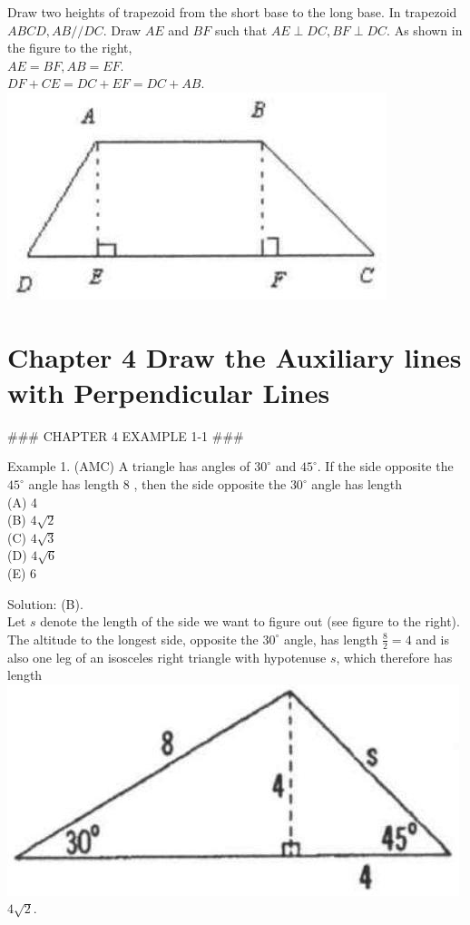 \documentclass[10pt]{article}
\begin{document}
Draw two heights of trapezoid from the short base to the long base.
In trapezoid \(A B C D, A B / / D C\). Draw \(A E\) and \(B F\) such that \(A E \perp D C, B F \perp D C\). As shown in the figure to the right,\\
\(A E=B F, A B=E F\).\\
\(D F+C E=D C+E F=D C+A B\).\\
\includegraphics[max width=\textwidth, center]{2025_04_17_97bc1f7e44d93c271a88g-074(2)}

\section*{Chapter 4 Draw the Auxiliary lines with Perpendicular Lines}

### CHAPTER 4 EXAMPLE 1-1 ###

Example 1. (AMC) A triangle has angles of \(30^{\circ}\) and \(45^{\circ}\). If the side opposite the \(45^{\circ}\) angle has length 8 , then the side opposite the \(30^{\circ}\) angle has length\\
(A) 4\\
(B) \(4 \sqrt{2}\)\\
(C) \(4 \sqrt{3}\)\\
(D) \(4 \sqrt{6}\)\\
(E) 6

Solution: (B).\\
Let \(s\) denote the length of the side we want to figure out (see figure to the right). The altitude to the longest side, opposite the \(30^{\circ}\) angle, has length \(\frac{8}{2}=4\) and is also one leg of an isosceles right triangle with hypotenuse \(s\), which therefore has length\\
\includegraphics[max width=\textwidth]{2025_04_17_97bc1f7e44d93c271a88g-075(1)} \(4 \sqrt{2}\).
\end{document}
